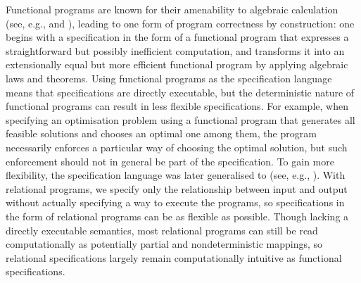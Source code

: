Functional programs are known for their amenability to algebraic calculation (see, e.g., \citet{Backus-liberated} and \citet{Bird-pearls}), leading to one form of program correctness by construction: one begins with a specification in the form of a functional program that expresses a straightforward but possibly inefficient computation, and transforms it into an extensionally equal but more efficient functional program by applying algebraic laws and theorems.
Using functional programs as the specification language means that specifications are directly executable, but the deterministic nature of functional programs can result in less flexible specifications.
For example, when specifying an optimisation problem using a functional program that generates all feasible solutions and chooses an optimal one among them, the program necessarily enforces a particular way of choosing the optimal solution, but such enforcement should not in general be part of the specification.
To gain more flexibility, the specification language was later generalised to  (see, e.g., \citet{Bird-functional-algorithm-design}).
With relational programs, we specify only the relationship between input and output without actually specifying a way to execute the programs, so specifications in the form of relational programs can be as flexible as possible.
Though lacking a directly executable semantics, most relational programs can still be read computationally as potentially partial and nondeterministic mappings, so relational specifications largely remain computationally intuitive as functional specifications.

